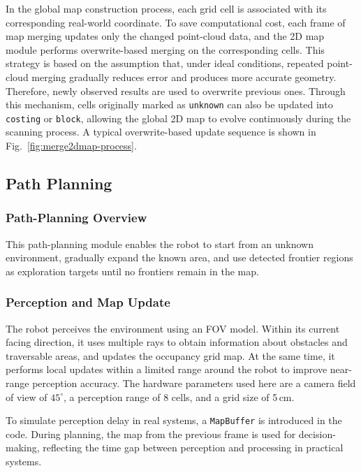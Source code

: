 \documentclass[12pt]{interim_report}
\begin{document}
In the global map construction process, each grid cell is associated with its corresponding real-world coordinate. To save computational cost, each frame of map merging updates only the changed point-cloud data, and the 2D map module performs overwrite-based merging on the corresponding cells. This strategy is based on the assumption that, under ideal conditions, repeated point-cloud merging gradually reduces error and produces more accurate geometry. Therefore, newly observed results are used to overwrite previous ones. Through this mechanism, cells originally marked as \texttt{unknown} can also be updated into \texttt{costing} or \texttt{block}, allowing the global 2D map to evolve continuously during the scanning process. A typical overwrite-based update sequence is shown in Fig.~\ref{fig:merge2dmap-process}.

\subsection{Path Planning}
\label{subsec:path-planning-method-weijie-chen}

\subsubsection{Path-Planning Overview}

This path-planning module enables the robot to start from an unknown environment, gradually expand the known area, and use detected frontier regions as exploration targets until no frontiers remain in the map.

\subsubsection{Perception and Map Update}

The robot perceives the environment using an FOV model. Within its current facing direction, it uses multiple rays to obtain information about obstacles and traversable areas, and updates the occupancy grid map. At the same time, it performs local updates within a limited range around the robot to improve near-range perception accuracy. The hardware parameters used here are a camera field of view of \(45^\circ\), a perception range of 8 cells, and a grid size of 5\,cm.

To simulate perception delay in real systems, a \texttt{MapBuffer} is introduced in the code. During planning, the map from the previous frame is used for decision-making, reflecting the time gap between perception and processing in practical systems.
\end{document}
